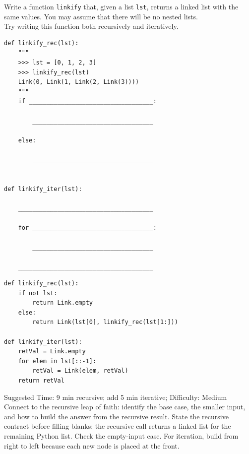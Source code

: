 \begin{blocksection}
\question Write a function \texttt{linkify} that, given a list \texttt{lst}, returns a linked list with the same values. You may assume that there will be no nested lists. \\

Try writing this function both recursively and iteratively. \\

\begin{lstlisting}
def linkify_rec(lst):
    """
    >>> lst = [0, 1, 2, 3]
    >>> linkify_rec(lst)
    Link(0, Link(1, Link(2, Link(3))))
    """
    if ___________________________________:

        __________________________________

    else: 

        __________________________________


def linkify_iter(lst):

    ______________________________________

    for __________________________________:

        __________________________________

    ______________________________________

\end{lstlisting}
\begin{solution}[1in]
\begin{lstlisting}
def linkify_rec(lst):
    if not lst:
        return Link.empty
    else:
        return Link(lst[0], linkify_rec(lst[1:]))

def linkify_iter(lst):
    retVal = Link.empty
    for elem in lst[::-1]:
        retVal = Link(elem, retVal)
    return retVal
\end{lstlisting}
\end{solution}
\end{blocksection}

\begin{questionmeta}
    Suggested Time: 9 min recursive; add 5 min iterative; Difficulty: Medium
    Connect to the recursive leap of faith: identify the base case, the smaller input, and how to build the answer from the recursive result. State the recursive contract before filling blanks: the recursive call returns a linked list for the remaining Python list. Check the empty-input case. For iteration, build from right to left because each new node is placed at the front.
\end{questionmeta}
